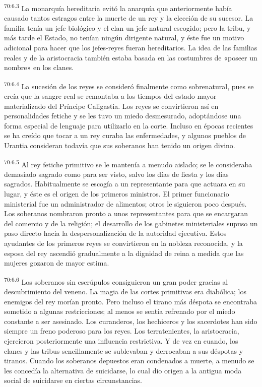 \par
\textsuperscript{70:6.3} La monarquía hereditaria evitó la anarquía que anteriormente había causado tantos estragos entre la muerte de un rey y la elección de su sucesor. La familia tenía un jefe biológico y el clan un jefe natural escogido; pero la tribu, y más tarde el Estado, no tenían ningún dirigente natural, y éste fue un motivo adicional para hacer que los jefes-reyes fueran hereditarios. La idea de las familias reales y de la aristocracia también estaba basada en las costumbres de «poseer un nombre» en los clanes.

\par
\textsuperscript{70:6.4} La sucesión de los reyes se consideró finalmente como sobrenatural, pues se creía que la sangre real se remontaba a los tiempos del estado mayor materializado del Príncipe Caligastia. Los reyes se convirtieron así en personalidades fetiche y se les tuvo un miedo desmesurado, adoptándose una forma especial de lenguaje para utilizarlo en la corte. Incluso en épocas recientes se ha creído que tocar a un rey curaba las enfermedades, y algunos pueblos de Urantia consideran todavía que sus soberanos han tenido un origen divino.

\par
\textsuperscript{70:6.5} Al rey fetiche primitivo se le mantenía a menudo aislado; se le consideraba demasiado sagrado como para ser visto, salvo los días de fiesta y los días sagrados. Habitualmente se escogía a un representante para que actuara en su lugar, y éste es el origen de los primeros ministros. El primer funcionario ministerial fue un administrador de alimentos; otros le siguieron poco después. Los soberanos nombraron pronto a unos representantes para que se encargaran del comercio y de la religión; el desarrollo de los gabinetes ministeriales supuso un paso directo hacia la despersonalización de la autoridad ejecutiva. Estos ayudantes de los primeros reyes se convirtieron en la nobleza reconocida, y la esposa del rey ascendió gradualmente a la dignidad de reina a medida que las mujeres gozaron de mayor estima.

\par
\textsuperscript{70:6.6} Los soberanos sin escrúpulos consiguieron un gran poder gracias al descubrimiento del veneno. La magia de las cortes primitivas era diabólica; los enemigos del rey morían pronto. Pero incluso el tirano más déspota se encontraba sometido a algunas restricciones; al menos se sentía refrenado por el miedo constante a ser asesinado. Los curanderos, los hechiceros y los sacerdotes han sido siempre un freno poderoso para los reyes. Los terratenientes, la aristocracia, ejercieron posteriormente una influencia restrictiva. Y de vez en cuando, los clanes y las tribus sencillamente se sublevaban y derrocaban a sus déspotas y tiranos. Cuando los soberanos depuestos eran condenados a muerte, a menudo se les concedía la alternativa de suicidarse, lo cual dio origen a la antigua moda social de suicidarse en ciertas circunstancias.

